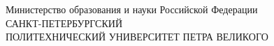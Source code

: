 \thispagestyle{empty}%
{}




\begin{center}%
	Министерство образования и науки Российской Федерации\\
			\noindent\makebox[\linewidth]{\rule{0.33\textwidth}{1.3pt}} %
	\MakeUppercase{Санкт-Петербургский } \\ \MakeUppercase{политехнический университет Петра Великого}
	\noindent\makebox[\linewidth]{\rule{\textwidth}{1.3pt}}
\end{center}%


%
%

%
%
\vspace{0pt plus4fill} %

%

